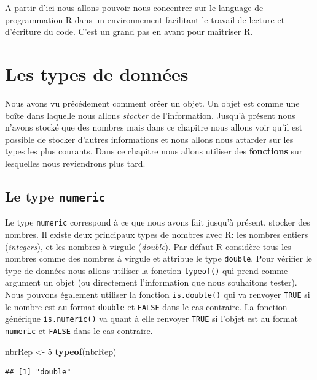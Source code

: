 \documentclass[]{book}
\newenvironment{Shaded}{\begin{snugshade}}{\end{snugshade}}
\newcommand{\KeywordTok}[1]{\textcolor[rgb]{0.13,0.29,0.53}{\textbf{#1}}}
\newcommand{\DecValTok}[1]{\textcolor[rgb]{0.00,0.00,0.81}{#1}}
\newcommand{\StringTok}[1]{\textcolor[rgb]{0.31,0.60,0.02}{#1}}
\newcommand{\NormalTok}[1]{#1}
\begin{document}
A partir d'ici nous allons pouvoir nous concentrer sur le language de
programmation R dans un environnement facilitant le travail de lecture
et d'écriture du code. C'est un grand pas en avant pour maîtriser R.

\chapter{Les types de données}\label{dataType1}

Nous avons vu précédement comment créer un objet. Un objet est comme une
boîte dans laquelle nous allons \emph{stocker} de l'information. Jusqu'à
présent nous n'avons stocké que des nombres mais dans ce chapitre nous
allons voir qu'il est possible de stocker d'autres informations et nous
allons nous attarder sur les types les plus courants. Dans ce chapitre
nous allons utiliser des \textbf{fonctions} sur lesquelles nous
reviendrons plus tard.

\section{\texorpdfstring{Le type
\texttt{numeric}}{Le type numeric}}\label{le-type-numeric}

Le type \texttt{numeric} correspond à ce que nous avons fait jusqu'à
présent, stocker des nombres. Il existe deux principaux types de nombres
avec R: les nombres entiers (\emph{integers}), et les nombres à virgule
(\emph{double}). Par défaut R considère tous les nombres comme des
nombres à virgule et attribue le type \texttt{double}. Pour vérifier le
type de données nous allons utiliser la fonction \texttt{typeof()} qui
prend comme argument un objet (ou directement l'information que nous
souhaitons tester). Nous pouvons également utiliser la fonction
\texttt{is.double()} qui va renvoyer \texttt{TRUE} si le nombre est au
format \texttt{double} et \texttt{FALSE} dans le cas contraire. La
fonction générique \texttt{is.numeric()} va quant à elle renvoyer
\texttt{TRUE} si l'objet est au format \texttt{numeric} et
\texttt{FALSE} dans le cas contraire.

\begin{Shaded}
\begin{Highlighting}[]
\NormalTok{nbrRep <-}\StringTok{ }\DecValTok{5}
\KeywordTok{typeof}\NormalTok{(nbrRep)}
\end{Highlighting}
\end{Shaded}

\begin{verbatim}
## [1] "double"
\end{verbatim}
\end{document}
